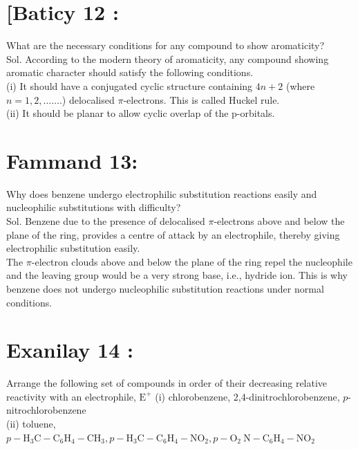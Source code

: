 \documentclass[10pt]{article}
\begin{document}
\section*{[Baticy 12 :}
What are the necessary conditions for any compound to show aromaticity?\\
Sol. According to the modern theory of aromaticity, any compound showing aromatic character should satisfy the following conditions.\\
(i) It should have a conjugated cyclic structure containing $4 n+2$ (where $n=1,2, \ldots \ldots$.) delocalised $\pi$-electrons. This is called Huckel rule.\\
(ii) It should be planar to allow cyclic overlap of the p-orbitals.

\section*{Fammand 13:}
Why does benzene undergo electrophilic substitution reactions easily and nucleophilic substitutions with difficulty?\\
Sol. Benzene due to the presence of delocalised $\pi$-electrons above and below the plane of the ring, provides a centre of attack by an electrophile, thereby giving electrophilic substitution easily.\\
The $\pi$-electron clouds above and below the plane of the ring repel the nucleophile and the leaving group would be a very strong base, i.e., hydride ion. This is why benzene does not undergo nucleophilic substitution reactions under normal conditions.

\section*{Exanilay 14 :}
Arrange the following set of compounds in order of their decreasing relative reactivity with an electrophile, $\mathrm{E}^{+}$ (i) chlorobenzene, 2,4-dinitrochlorobenzene, $p$-nitrochlorobenzene\\
(ii) toluene, $p-\mathrm{H}_{3} \mathrm{C}-\mathrm{C}_{6} \mathrm{H}_{4}-\mathrm{CH}_{3}, p-\mathrm{H}_{3} \mathrm{C}-\mathrm{C}_{6} \mathrm{H}_{4}-\mathrm{NO}_{2}, p-\mathrm{O}_{2} \mathrm{~N}-\mathrm{C}_{6} \mathrm{H}_{4}-\mathrm{NO}_{2}$
\end{document}
